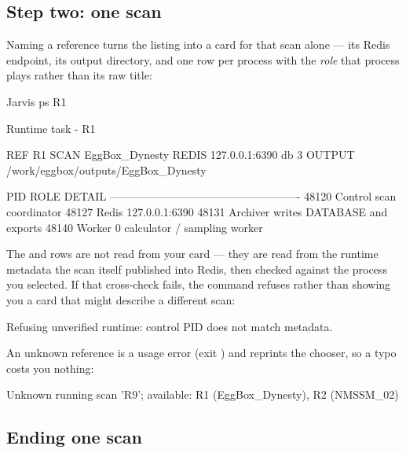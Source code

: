 \subsection{Step two: one scan}

Naming a reference turns the listing into a card for that scan alone --- its Redis
endpoint, its output directory, and one row per process with the \emph{role} that process
plays rather than its raw title:

\begin{terminal}
\begin{jcmd}
Jarvis ps R1
\end{jcmd}
\termsep
\begin{jout}
Runtime task - R1

  REF    R1
  SCAN   EggBox_Dynesty
  REDIS  127.0.0.1:6390   db 3
  OUTPUT /work/eggbox/outputs/EggBox_Dynesty

    PID   ROLE       DETAIL
  ----------------------------------------------------
  48120   Control    scan coordinator
  48127   Redis      127.0.0.1:6390
  48131   Archiver   writes DATABASE and exports
  48140   Worker 0   calculator / sampling worker
\end{jout}
\end{terminal}

The  and  rows are not read from your card --- they are read from
the runtime metadata the scan itself published into Redis, then checked against the
process you selected. If that cross-check fails, the command refuses rather than showing
you a card that might describe a different scan:

\begin{terminal}
\begin{jout}
Refusing unverified runtime: control PID does not match metadata.
\end{jout}
\end{terminal}

An unknown reference is a usage error (exit ) and reprints the chooser, so a typo
costs you nothing:

\begin{terminal}
\begin{jout}
Unknown running scan 'R9'; available: R1 (EggBox_Dynesty), R2 (NMSSM_02)
\end{jout}
\end{terminal}

\subsection{Ending one scan}

